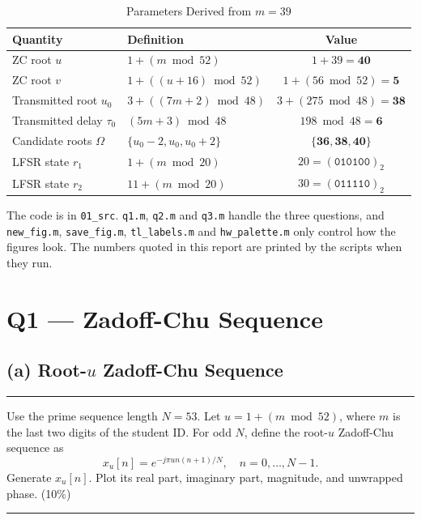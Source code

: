 \documentclass[12pt,a4paper]{report}
\newcommand{\question}[1]{%
    \hrule
    \vspace{0.2cm}
    #1
    \vspace{0.2cm}
    \hrule
    \vspace{0.5cm}
}
\begin{document}
\begin{table}[H]
\centering
\caption{Parameters Derived from $m = 39$}
\setlength{\tabcolsep}{10pt}
\renewcommand{\arraystretch}{1.25}
\begin{tabular}{llc}
\toprule
\textbf{Quantity} & \textbf{Definition} & \textbf{Value} \\
\midrule
ZC root $u$                  & $1 + (m \bmod 52)$                 & $1 + 39 = \mathbf{40}$ \\
ZC root $v$                  & $1 + ((u + 16) \bmod 52)$          & $1 + (56 \bmod 52) = \mathbf{5}$ \\
Transmitted root $u_0$       & $3 + ((7m + 2) \bmod 48)$          & $3 + (275 \bmod 48) = \mathbf{38}$ \\
Transmitted delay $\tau_0$   & $(5m + 3) \bmod 48$                & $198 \bmod 48 = \mathbf{6}$ \\
Candidate roots $\Omega$     & $\{u_0 - 2, u_0, u_0 + 2\}$        & $\mathbf{\{36, 38, 40\}}$ \\
LFSR state $r_1$             & $1 + (m \bmod 20)$                 & $20 = (\texttt{010100})_2$ \\
LFSR state $r_2$             & $11 + (m \bmod 20)$                & $30 = (\texttt{011110})_2$ \\
\bottomrule
\end{tabular}
\end{table}

The code is in \texttt{01\_src}. \texttt{q1.m}, \texttt{q2.m} and \texttt{q3.m} handle the three questions, and
\texttt{new\_fig.m}, \texttt{save\_fig.m}, \texttt{tl\_labels.m} and \texttt{hw\_palette.m} only control how the figures look.
The numbers quoted in this report are printed by the scripts when they run.

\newpage

\chapter{Q1 — Zadoff-Chu Sequence}
\section{(a) Root-$u$ Zadoff-Chu Sequence}

\question{Use the prime sequence length $N = 53$. Let $u = 1 + (m \bmod 52)$, where $m$ is the last two digits of
the student ID. For odd $N$, define the root-$u$ Zadoff-Chu sequence as
\[ x_u[n] = e^{-j\pi u n(n+1)/N}, \quad n = 0, \ldots, N-1. \]
Generate $x_u[n]$. Plot its real part, imaginary part, magnitude, and unwrapped phase. (10\%)}
\end{document}
